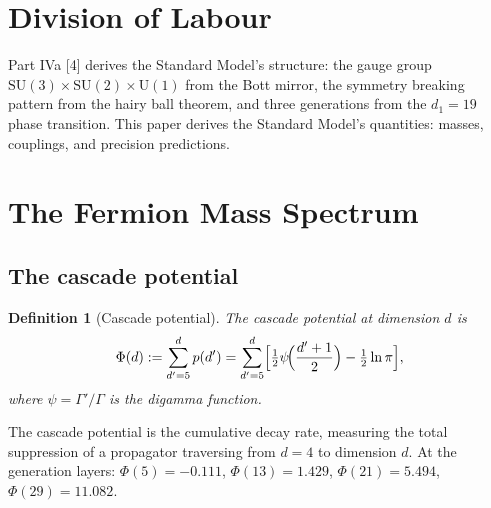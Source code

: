 \documentclass[12pt,a4paper]{article}
\newtheorem{definition}[theorem]{Definition}
\begin{document}
\tableofcontents
\newpage

\section{Division of Labour}\label{sec:division-of-labour}

Part IVa [4] derives the Standard Model's structure: the gauge group $\text{SU}(3) \times \text{SU}(2) \times \text{U}(1)$ from the Bott mirror, the symmetry breaking pattern from the hairy ball theorem, and three generations from the $d_1 = 19$ phase transition. This paper derives the Standard Model's quantities: masses, couplings, and precision predictions.

\section{The Fermion Mass Spectrum}\label{sec:fermion-mass}

\subsection{The cascade potential}

\begin{definition}[Cascade potential]
The cascade potential at dimension $d$ is
\[
\Phi(d) := \sum_{d'=5}^{d} p(d') = \sum_{d'=5}^{d} \Bigl[\tfrac{1}{2}\psi\!\Bigl(\frac{d'+1}{2}\Bigr) - \tfrac{1}{2}\ln\pi\Bigr],
\]
where $\psi = \Gamma'/\Gamma$ is the digamma function.
\end{definition}

The cascade potential is the cumulative decay rate, measuring the total suppression of a propagator traversing from $d = 4$ to dimension $d$. At the generation layers: $\Phi(5) = -0.111$, $\Phi(13) = 1.429$, $\Phi(21) = 5.494$, $\Phi(29) = 11.082$.
\end{document}
